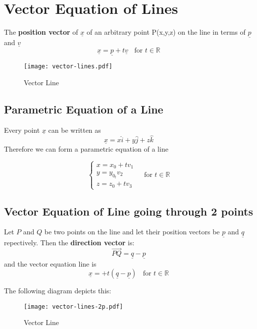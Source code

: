 \section{Vector Equation of Lines}

\begin{definition}
	The {\bf position vector} of $\underline{x}$ of an arbitrary point P(x,y,z) on the line in terms of $\underline{p}$ and $\underline{v}$
	\begin{equation}
		\label{eq: vector-lines}
		\underline{x} = \underline{p} + t\underline{v} \ \ \ \ \text{for } t \in \mathbb{R}
	\end{equation}
\end{definition}

\begin{figure}[H]
	\centering
	\texttt{[image: vector-lines.pdf]}
	\caption{Vector Line}
	\label{fig:figure-vector-lines}
\end{figure}

\subsection{Parametric Equation of a Line}
\begin{note}
	Every point $\underline{x}$ can be written as
	$$\underline{x} = x\hat{i} + y\hat{j} + z\hat{k}$$
	Therefore we can form a parametric equation of a line
\end{note}

\begin{definition}
	\begin{equation}
		\label{eq: parametric-vector-lines}
		\begin{cases}
			x = x_0 + tv_1 \\
			y= y_0 _ tv_2  \\
			z = z_0 + tv_3
		\end{cases}
		\ \ \ \ \ \text{for } t \in \mathbb{R}
	\end{equation}

\end{definition}

\subsection{Vector Equation of Line going through 2 points}
\begin{definition}
	Let $P$ and $Q$ be two points on the line and let their position vectors be $\underline{p}$ and $\underline{q}$ repectively. Then the
		{\bf direction vector} is:
	$$\vec{PQ} = \underline{q} - \underline{p}$$
	and the vector equation line is
	\begin{equation}
		\label{eq vector-lines-2p}
		\underline{x} = + t(\underline{q} - \underline{p}) \ \ \ \ \text{for } t \in \mathbb{R}
	\end{equation}
\end{definition}
The following diagram depicts this:

\begin{figure}[H]
	\centering
	\texttt{[image: vector-lines-2p.pdf]}
	\caption{Vector Line}
	\label{fig:figure-vector-lines-2p}
\end{figure}
